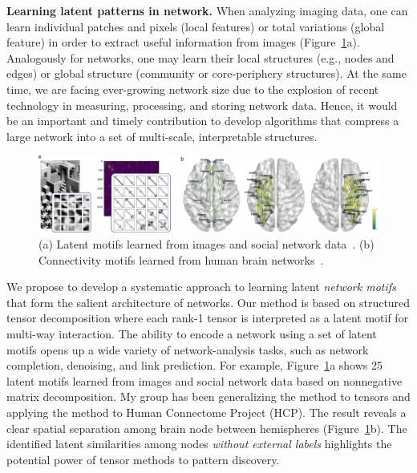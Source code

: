 \documentclass[10pt]{article}
\theoremstyle{plain}
\theoremstyle{definition}
\begin{document}
{\bf Learning latent patterns in network.} 
When analyzing imaging data, one can learn individual patches and pixels (local features) or total variations (global feature) in order to extract useful information from images (Figure~\ref{fig:3}a). Analogously for networks, one may learn their local structures (e.g., nodes and edges) or global structure (community or core-periphery structures). At the same time, we are facing ever-growing network size due to the explosion of recent technology in measuring, processing, and storing network data. Hence, it would be an important and timely contribution to develop algorithms that compress a large network into a set of multi-scale, interpretable structures.

\begin{figure}[H]
\begin{center}
\includegraphics[width=1\textwidth]{example_new.pdf}
\caption{(a) Latent motifs learned from images and social network data~\cite{lyu2020online}. (b) Connectivity motifs learned from human brain networks~\cite{lee2020tensor}. }\label{fig:3}
\end{center}
\end{figure} 
\vspace{-.4cm}

We propose to develop a systematic approach to learning latent \emph{network motifs} that form the salient architecture of networks. Our method is based on structured tensor decomposition where each rank-1 tensor is interpreted as a latent motif for multi-way interaction. The ability to encode a network using a set of latent motifs opens up a wide variety of network-analysis tasks, such as network completion, denoising, and link prediction. For example, Figure~\ref{fig:3}a shows 25 latent motifs learned from images and social network data based on nonnegative matrix decomposition. My group has been generalizing the method to tensors and applying the method to Human Connectome Project (HCP). The result reveals a clear spatial separation among brain node between hemispheres (Figure~\ref{fig:3}b). The identified latent similarities among nodes \emph{without external labels} highlights the potential power of tensor methods to pattern discovery. 
\end{document}
